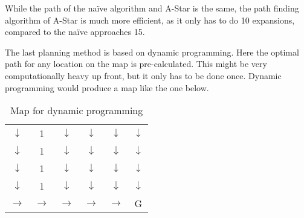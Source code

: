 \documentclass[Main]{subfiles}
\begin{document}
While the path of the naïve algorithm and A-Star is the same, the path finding algorithm of A-Star is much more efficient, as it only has to do 10 expansions, compared to the naïve approaches 15.

The last planning method is based on dynamic programming. 
Here the optimal path for any location on the map is pre-calculated. 
This might be very computationally heavy up front, but it only has to be done once. 
Dynamic programming would produce a map like the one below.
\begin{table}[H]
	\centering
	\begin{tabular}{cccccc}
		$\downarrow$ & 1 & $\downarrow$ & $\downarrow$ & $\downarrow$ & $\downarrow$  \\ 
		$\downarrow$ & 1 & $\downarrow$ & $\downarrow$ & $\downarrow$ & $\downarrow$  \\ 
		$\downarrow$ & 1 & $\downarrow$ & $\downarrow$ & $\downarrow$ & $\downarrow$  \\ 
		$\downarrow$ & 1 & $\downarrow$ & $\downarrow$ & $\downarrow$ & $\downarrow$  \\  
		$\rightarrow$ & $\rightarrow$ & $\rightarrow$ & $\rightarrow$ & $\rightarrow$ & G  \\ 
	\end{tabular}
\caption{Map for dynamic programming}
\label{table:dynamic_map} 
\end{table} \noindent
\end{document}
